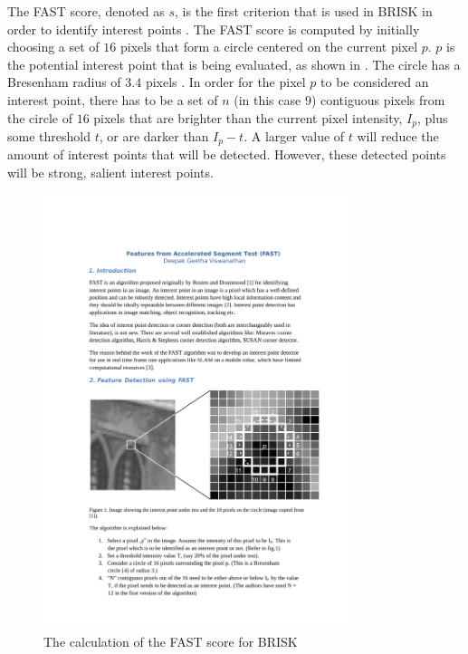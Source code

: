 \documentclass[11pt]{report}
\begin{document}
The FAST score, denoted as $s$, is the first criterion that is used in BRISK in order to identify interest points \cite{Rosten2006}. The FAST score is computed by initially choosing a set of $16$ pixels that form a circle centered on the current pixel $p$. $p$ is the potential interest point that is being evaluated, as shown in  \cite{Rosten2006}. The circle has a Bresenham radius of $3.4$ pixels \cite{Mair2010}. In order for the pixel $p$ to be considered an interest point, there has to be a set of $n$ (in this case $9$) contiguous pixels from the circle of $16$ pixels that are brighter than the current pixel intensity, $I_p$, plus some threshold $t$, or are darker than $I_p - t$. A larger value of $t$ will reduce the amount of interest points that will be detected. However, these detected points will be strong, salient interest points. \\

\begin{figure}[h!] 
  \centering
    \includegraphics[width=0.8\textwidth]{../Drawings/methods/FASTScoreCalculation.pdf}
    \caption{The calculation of the FAST score for BRISK}
    \label{fig:fastScore}
\end{figure}
\end{document}
